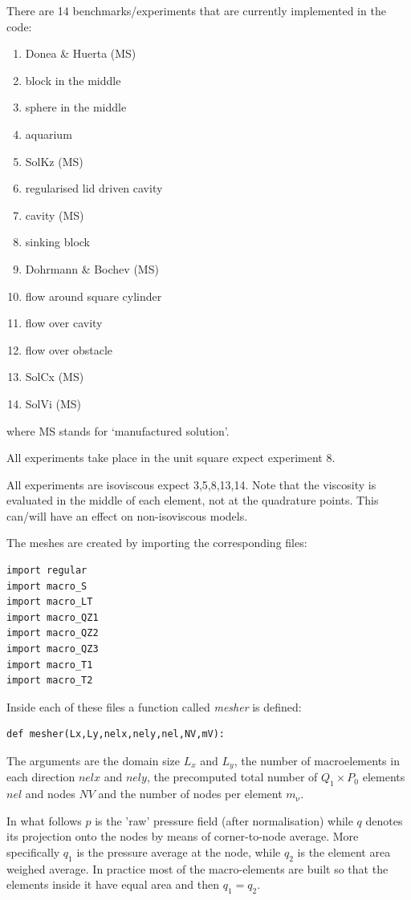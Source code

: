 There are 14 benchmarks/experiments that are currently implemented in the code:
\begin{enumerate}
\item Donea \& Huerta (MS) %
\item block in the middle %
\item sphere in the middle %
\item aquarium %
\item SolKz (MS) %
\item regularised lid driven cavity %
\item cavity (MS) %
\item sinking block %
\item Dohrmann \& Bochev (MS) \cite{dobo04} %
\item flow around square cylinder %
\item flow over cavity %
\item flow over obstacle %
\item SolCx (MS) %
\item SolVi (MS) %
\end{enumerate}
where MS stands for `manufactured solution'.

All experiments take place in the unit square expect experiment 8.

All experiments are isoviscous expect 3,5,8,13,14.
Note that the viscosity is evaluated in the middle of each element, not 
at the quadrature points. This can/will have an effect on non-isoviscous models.

\newpage
The meshes are created by importing the corresponding files:
\begin{lstlisting} 
import regular
import macro_S
import macro_LT
import macro_QZ1 
import macro_QZ2
import macro_QZ3
import macro_T1
import macro_T2
\end{lstlisting} 
Inside each of these files a function called {\sl mesher} is defined: 
\begin{lstlisting} 
def mesher(Lx,Ly,nelx,nely,nel,NV,mV):
\end{lstlisting} 
The arguments are the domain size $L_x$ and $L_y$, the number of macroelements
in each direction $nelx$ and $nely$, the precomputed total number of $Q_1\times P_0$ 
elements $nel$ and nodes $NV$ and the number of nodes per element $m_\upnu$.  

In what follows $p$ is the 'raw' pressure field (after normalisation)
while $q$ denotes its projection onto the nodes by means of corner-to-node average.
More specifically $q_1$ is the pressure average at the node, 
while $q_2$  is the element area weighed average.
In practice most of the macro-elements are built so that 
the elements inside it have equal area and then $q_1=q_2$. 


